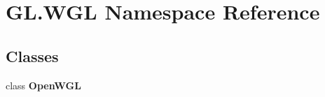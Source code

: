 \hypertarget{namespace_g_l_1_1_w_g_l}{}\section{G\+L.\+W\+GL Namespace Reference}
\label{namespace_g_l_1_1_w_g_l}
\subsection*{Classes}
\begin{DoxyCompactItemize}
\item 
class {\bfseries Open\+W\+GL}
\end{DoxyCompactItemize}

